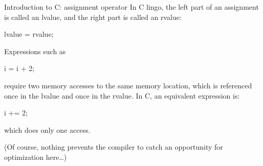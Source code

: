 \begin{frame}[fragile]{Introduction to C: assignment operator}
In C lingo, the left part of an assignment is called an
lvalue, and the right part is called an rvalue:


\vspace{20pt}

\begin{center}
           lvalue = rvalue;
\end{center}


\vspace{20pt}

Expressions such as 

\begin{center}
           i = i + 2;
\end{center}


\vspace{20pt}

require two memory accesses to the same memory location,
which is referenced once in the lvalue and once in the rvalue.
In C, an equivalent expression is:


\vspace{20pt}

\begin{center}
            i += 2;
\end{center}


\vspace{20pt}

which does only one access.



\vspace{20pt}

(Of course, nothing prevents the compiler to catch an opportunity
for optimization here\ldots)


\end{frame}
